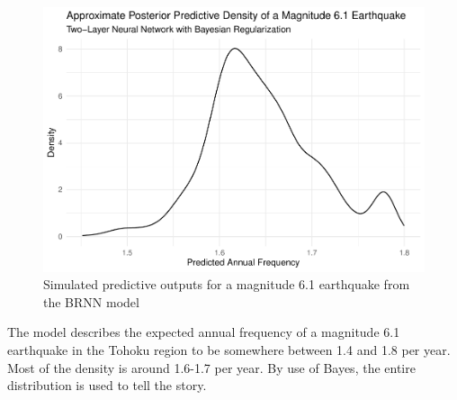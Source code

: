 \begin{figure}[H]
    \center
    \includegraphics[width=0.75\linewidth]{Appendix_eq_files/figure-latex/unnamed-chunk-17-1.pdf}
    \caption{\footnotesize{Simulated predictive outputs for a magnitude 6.1 earthquake from the BRNN model}}
    \label{posteriorpredictive}
\end{figure}

The model describes the expected annual frequency of a magnitude 6.1 earthquake in the Tohoku region to be somewhere between 1.4 and 1.8 per year.  Most of the density is around 1.6-1.7 per year.  By use of Bayes, the entire distribution is used to tell the story.